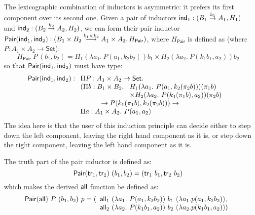 \documentclass{amsart}
\newcommand{\Set}{\mathsf{Set}}
\begin{document}
The lexicographic combination of inductors is asymmetric: it prefers
its first component over its second one. Given a pair of inductors
$\mathsf{ind}_1 : (B_1 \stackrel{k_1}\to A_1, H_1)$ and $\mathsf{ind}_2 : (B_2
\stackrel{k_2}\to A_2, H_2)$, we can form their pair inductor
$\mathsf{Pair}(\mathsf{ind}_1, \mathsf{ind}_2) : (B_1 \times B_2 \stackrel{k_1 \times
  k_2}\longrightarrow A_1 \times A_2, H_{\mathsf{Pair}})$, where
$H_{\mathsf{Pair}}$ is defined as (where $P : A_1 \times A_2 \to
\Set$):
\begin{displaymath}
  H_{\mathsf{Pair}}\ P\ (b_1,b_2) = H_1(\lambda a_1.\ P(a_1,k_2b_2))b_1 \times H_2(\lambda a_2.\ P(k_1b_1,a_2))b_2
\end{displaymath}
so that $\mathsf{Pair}(\mathsf{ind}_1, \mathsf{ind}_2)$ must have type:
\begin{displaymath}
  \mathsf{Pair}(\ind_1, \ind_2) :
  \begin{array}[t]{l}
    \Pi P : A_1 \times A_2 \to \Set. \\
        (\Pi b : B_1 \times B_2.\
    \begin{array}[t]{l}
      H_1(\lambda a_1.\ P(a_1, k_2(\pi_2 b)))(\pi_1 b) \\
      \times H_2(\lambda a_2.\ P(k_1(\pi_1b), a_2))(\pi_2 b)
    \end{array} \\
    \quad\quad\quad\to P (k_1 (\pi_1 b), k_2 (\pi_2 b))) \to \\
    \Pi a : A_1 \times A_2.\ P (a_1, a_2)
  \end{array}
\end{displaymath}
The idea here is that the user of this induction principle can decide
either to step down the left component, leaving the right hand
component as it is, or step down the right component, leaving the left
hand component as it is.

The truth part of the pair inductor is defined as:
\begin{displaymath}
  \mathsf{Pair}(\mathsf{tr}_1, \mathsf{tr}_2)\ (b_1, b_2) = (\mathsf{tr}_1\ b_1 , \mathsf{tr}_2\ b_2)
\end{displaymath}
which makes the derived $\mathsf{all}$ function be defined as:
\begin{displaymath}
  \mathsf{Pair}(\mathsf{all})\ P\ (b_1,b_2)\ p = (
  \begin{array}[t]{l}
    \mathsf{all}_1\ (\lambda a_1.\ P(a_1,k_2b_2))\ b_1\ (\lambda a_1. p (a_1,k_2b_2)), \\
    \mathsf{all}_2\ (\lambda a_2.\ P(k_1b_1,a_2))\ b_2\ (\lambda a_2. p (k_1b_1,a_2)))
  \end{array}
\end{displaymath}
\end{document}

